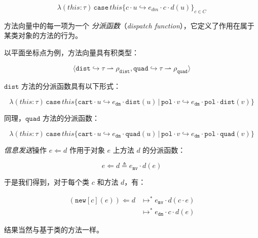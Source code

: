 $$ \lambda (this : \tau) \, {\mathtt{case}} \, this \{ c \cdot u \hookrightarrow e_{dm} \cdot c \cdot d(u) \}_{c \in C}$$

方法向量中的每一项为一个 \textit{分派函数}（\textit{dispatch function}），它定义了作用在属于某类对象的方法的行为。

以平面坐标点为例，方法向量具有积类型：

$$ \langle {\mathtt{dist}} \hookrightarrow \tau \rightharpoonup \rho_{\mathtt{dist}}, {\mathtt{quad}} \hookrightarrow \tau \rightharpoonup \rho_{\mathtt{quad}} \rangle $$

$\mathtt{dist}$ 方法的分派函数具有以下形式：

$$ \lambda(this : \tau) \, {\mathtt{case}} \, this \{ {\mathtt{cart}} \cdot u \hookrightarrow e_{\mathtt{dm}} \cdot {\mathtt{dist}}(u) \, | \, {\mathtt{pol}} \cdot v \hookrightarrow e_{\mathtt{dm}} \cdot {\mathtt{pol}} \cdot {\mathtt{dist}}(v) \}$$

同理，$\mathtt{quad}$ 方法的分派函数：

$$ \lambda(this : \tau) \, {\mathtt{case}} \, this \{ {\mathtt{cart}} \cdot u \hookrightarrow e_{\mathtt{dm}} \cdot {\mathtt{quad}}(u) \, | \, {\mathtt{pol}} \cdot v \hookrightarrow e_{\mathtt{dm}} \cdot {\mathtt{pol}} \cdot {\mathtt{quad}}(v) \}$$

\textit{信息发送}操作 $e \Leftarrow d$ 作用于对象 $e$ 上方法 $d$ 的分派函数：

$$ e \Leftarrow d \triangleq e_{\mathtt{mv}} \cdot d(e) $$

于是我们得到，对于每个类 $c$ 和方法 $d$，有：

\begin{equation}
\begin{aligned}
({\mathtt{new}}[c](e)) \Leftarrow d & \longmapsto^{*} e_{\mathtt{mv}} \cdot d(c \cdot e) \\ 
& \longmapsto^{*} e_{\mathtt{dm}} \cdot c \cdot d(e)
 \nonumber
\end{aligned}
\end{equation}

结果当然与基于类的方法一样。